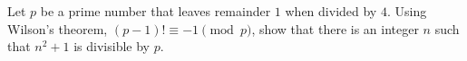 Let $p$ be a prime number that leaves remainder $1$ when divided by $4$. Using Wilson's theorem, $(p-1)!\equiv-1\pmod p$, show that there is an integer $n$ such that $n^2+1$ is divisible by $p$.
